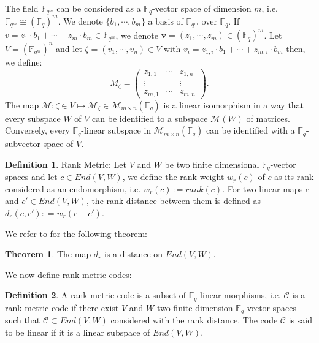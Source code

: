\documentclass{article}
\newcommand{\tmop}[1]{#1}          %
\newcommand{\Fq}{\mathbb{F}_q}
\theoremstyle{definition}
\newtheorem{theorem}{Theorem}
\newtheorem{definition}{Definition}
\begin{document}
\noindent The field $\mathbb{F}_{q^m}$ can be considered as a $\mathbb{F}_q$-vector
space of dimension $m$, i.e. $\mathbb{F}_{q^m} \cong (\mathbb{F}_q)^m$. We
denote $\{ b_1, \cdots, b_m \}$ a basis of $\mathbb{F}_{q^m}$ over
$\mathbb{F}_q$. If $v = z_1 \cdot b_1 + \cdots + z_m \cdot b_m \in
      \mathbb{F}_{q^m}$, we denote $\mathbf{v}= (z_1, \cdots, z_m) \in
      (\mathbb{F}_q)^m$. Let $V = (\mathbb{F}_{q^m})^n$ and let $\zeta = (v_1,
      \cdots, v_n) \in V$ with $v_i = z_{1, i} \cdot b_1 + \cdots + z_{m, i} \cdot
      b_m$ then, we define:
\[ M_{\zeta} = \left(\begin{array}{ccc}
            z_{1, 1} & \cdots & z_{1, n} \\
            \vdots   &        & \vdots   \\
            z_{m, 1} & \cdots & z_{m, n}
      \end{array}\right) . \]
The map $\mathcal{M}: \zeta \in V \longmapsto \mathcal{M}_{\zeta} \in
      \mathcal{M}_{m \times n} (\mathbb{F}_q)$ is a linear isomorphism in a way that
every subspace $W$ of $V$ can be identified to a subspace $\mathcal{M} (W)$ of matrices. Conversely, every $\mathbb{F}_q$-linear subspace in
$\mathcal{M}_{m \times n} (\mathbb{F}_q)$ can be identified with a  $\Fq$-subvector space of $V$.

\begin{definition}
      Rank Metric: Let $V$ and $W$ be two finite dimensional $\mathbb{F}_q$-vector
      spaces and let $c \in End (V, W)$, we define the rank weight $w_r (c)$
      of $c$ as its rank considered as an endomorphism, i.e. $w_r (c) :=
            \tmop{rank} (c)$. For two linear maps $c$ and $c' \in \tmop{End} (V, W)$, the rank distance between them is defined as $d_r (c, c') : = w_r (c - c')$.
\end{definition}

We refer to \cite{bartz_rank-metric_2022} for the following theorem:

\begin{theorem}
      The map $d_r$ is a distance on $\tmop{End} (V, W)$.
\end{theorem}

We now define rank-metric codes:

\begin{definition}
      A rank-metric code is a subset of $\mathbb{F}_q$-linear morphisms, i.e.
      $\mathcal{C}$ is a rank-metric code if there exist $V$ and $W$ two finite
      dimension $\mathbb{F}_q$-vector spaces such that $\mathcal{C} \subset
            \tmop{End} (V, W)$ considered with the rank distance. The code $\mathcal{C}$
      is said to be linear if it is a linear subspace of $\tmop{End} (V, W)$.
\end{definition}
\end{document}
